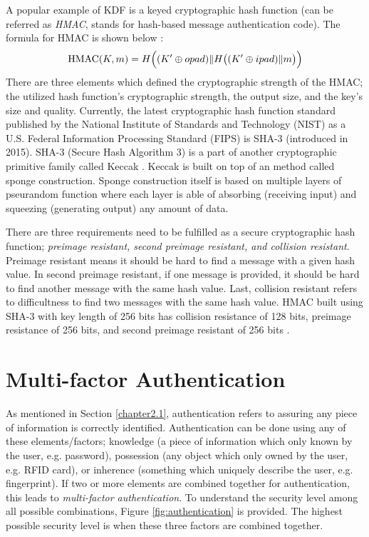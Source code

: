 A popular example of KDF is a keyed cryptographic hash function (can be referred as \textit{HMAC}, stands for hash-based message authentication code).
The formula for HMAC is shown below \cite{rfc2104}:
\begin{equation}
  {\displaystyle \operatorname {HMAC} (K,m)=H{\Bigl (}(K'\oplus opad)\|H{\bigl (}(K'\oplus ipad)\|m{\bigr )}{\Bigr )}}
\end{equation}
There are three elements which defined the cryptographic strength of the HMAC; the utilized hash function's cryptographic strength, the output size, and the key's size and quality. Currently, the latest cryptographic hash function standard published by the National Institute of Standards and Technology (NIST) as a U.S. Federal Information Processing Standard (FIPS) is SHA-3 (introduced in 2015). SHA-3 (Secure Hash Algorithm 3) is a part of another cryptographic primitive family called Keccak \cite{10.1007/978-3-642-38348-9_19}. Keccak is built on top of an method called sponge construction. Sponge construction itself is based on multiple layers of pseurandom function where each layer is able of absorbing (receiving input) and squeezing (generating output) any amount of data.

There are three requirements need to be fulfilled as a secure cryptographic hash function; \textit{preimage resistant, second preimage resistant, and collision resistant}. Preimage resistant means it should be hard to find a message with a given hash value. In second preimage resistant, if one message is provided, it should be hard to find another message with the same hash value.
Last, collision resistant refers to difficultness to find two messages with the same hash value. HMAC built using SHA-3 with key length of 256 bits has collision resistance of 128 bits, preimage resistance of 256 bits, and second preimage resistant of	256 bits \cite{technology2015sha}.

\section{Multi-factor Authentication}
\label{chp:2.mfa}
As mentioned in Section \ref{chapter2.1}, authentication refers to assuring any piece of information is correctly identified. Authentication can be done using any of these elements/factors; knowledge (a piece of information which only known by the user, e.g. password), possession (any object which only owned by the user, e.g. RFID card), or inherence (something which uniquely describe the user, e.g. fingerprint). If two or more elements are combined together for authentication, this leads to \textit{multi-factor authentication}. To understand the security level among all possible combinations, Figure \ref{fig:authentication} is provided. The highest possible security level is when these three factors are combined together.


